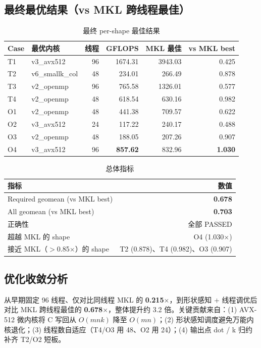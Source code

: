 \documentclass[11pt,a4paper,fontset=fandol]{ctexart}
\begin{document}
\subsection{最终最优结果（vs MKL 跨线程最佳）}
\begin{table}[H]
\centering
\caption{最终 per-shape 最佳结果}
\small
\begin{tabular}{llrrrr}
\toprule
Case & 最优内核 & 线程 & GFLOPS & MKL 最佳 & vs MKL best \\
\midrule
T1 & v3\_avx512 & 96 & 1674.31 & 3943.03 & 0.425 \\
T2 & v6\_smallk\_col & 48 & 234.01 & 266.49 & 0.878 \\
T3 & v2\_openmp & 96 & 765.58 & 1326.01 & 0.577 \\
T4 & v2\_openmp & 48 & 618.54 & 630.16 & 0.982 \\
O1 & v2\_openmp & 48 & 441.38 & 709.57 & 0.622 \\
O2 & v3\_avx512 & 24 & 117.22 & 240.17 & 0.488 \\
O3 & v2\_openmp & 48 & 188.05 & 207.26 & 0.907 \\
O4 & v3\_avx512 & 96 & \textbf{857.62} & 832.96 & \textbf{1.030} \\
\bottomrule
\end{tabular}
\end{table}

\begin{table}[H]
\centering
\caption{总体指标}
\small
\begin{tabular}{lr}
\toprule
指标 & 数值 \\
\midrule
Required geomean (vs MKL best) & \textbf{0.678} \\
All geomean (vs MKL best) & \textbf{0.703} \\
正确性 & 全部 PASSED \\
超越 MKL 的 shape & O4 (1.030$\times$) \\
接近 MKL（$>$0.85$\times$）的 shape & T2 (0.878)、T4 (0.982)、O3 (0.907) \\
\bottomrule
\end{tabular}
\end{table}

\subsection{优化收敛分析}
从早期固定 96 线程、仅对比同线程 MKL 的 \textbf{0.215$\times$}，到形状感知 + 线程调优后对比 MKL 跨线程最佳的 \textbf{0.678$\times$}，整体提升约 3.2 倍。关键贡献来自：(1) AVX-512 微内核将 C 写回从 $O(mnk)$ 降至 $O(mn)$；(2) 形状感知调度避免万能内核退化；(3) 线程数自适应（T4/O3 用 48、O2 用 24）；(4) 输出点 dot / k 归约补齐 T2/O2 短板。
\end{document}
